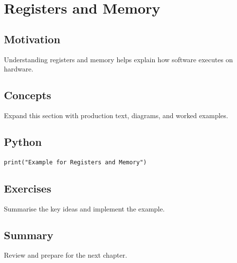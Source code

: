 \chapter{Registers and Memory}
\label{chap:27}



\section{Motivation}
Understanding registers and memory helps explain how software executes on hardware.

\section{Concepts}
Expand this section with production text, diagrams, and worked examples.

\section{Python}
\begin{lstlisting}
print("Example for Registers and Memory")
\end{lstlisting}

\section{Exercises}
\begin{exercise}
Summarise the key ideas and implement the example.
\end{exercise}

\section{Summary}
Review and prepare for the next chapter.
